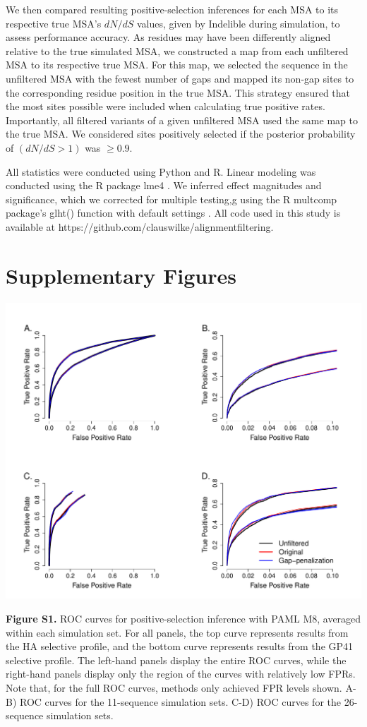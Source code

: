 \documentclass[11pt]{article}
\begin{document}
We then compared resulting positive-selection inferences for each MSA to its respective true MSA's $dN/dS$ values, given by Indelible during simulation, to assess performance accuracy. As residues may have been differently aligned relative to the true simulated MSA, we constructed a map from each unfiltered MSA to its respective true MSA. For this map, we selected the sequence in the unfiltered MSA with the fewest number of gaps and mapped its non-gap sites to the corresponding residue position in the true MSA. This strategy ensured that the most sites possible were included when calculating true positive rates. Importantly, all filtered variants of a given unfiltered MSA used the same map to the true MSA. We considered sites positively selected if the posterior probability of $(dN/dS>1)$ was $\geq0.9$.

All statistics were conducted using Python and R. Linear modeling was conducted using the R package lme4 \citep{Bates2012}. We inferred effect magnitudes and significance, which we corrected for multiple testing,g using the R multcomp package's glht() function with default settings \citep{Hothorn2008}. All code used in this study is available at https://github.com/clauswilke/alignment\underline{\hspace*{0.2cm}}filtering.



\newpage
\section{Supplementary Figures}


\centerline{\includegraphics[width=6.5in]{Figures/ROC_SI_paml.pdf}}
\noindent \textbf{Figure S1.} ROC curves for positive-selection inference with PAML M8, averaged within each simulation set. For all panels, the top curve represents results from the HA selective profile, and the bottom curve represents results from the GP41 selective profile. The left-hand panels display the entire ROC curves, while the right-hand panels display only the region of the curves with relatively low FPRs. Note that, for the full ROC curves, methods only achieved FPR levels shown. A-B) ROC curves for the 11-sequence simulation sets. C-D) ROC curves for the 26-sequence simulation sets.
\end{document}
